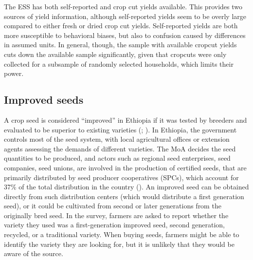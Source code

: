 \documentclass[11pt]{article}
\begin{document}

The ESS has both self-reported and crop cut yields available. This provides two sources of yield information, although self-reported yields seem to be overly large compared to either fresh or dried crop cut yields. Self-reported yields are both more susceptible to behavioral biases, but also to confusion caused by differences in assumed units. In general, though, the sample with available cropcut yields cuts down the available sample significantly, given that cropcuts were only collected for a subsample of randomly selected households, which limits their power.


\subsection{Improved seeds}

A crop seed is considered “improved” in Ethiopia if it was tested by breeders and evaluated to be superior to existing varieties  (\citep{MoA13}; \citep{kosmowski2020shining}). In Ethiopia, the government controls most of the seed system, with local agricultural offices or extension agents assessing the demands of different varieties. The MoA decides the seed quantities to be produced, and actors such as regional seed enterprises, seed companies, seed unions, are involved in the production of certified seeds, that are primarily distributed by seed producer cooperatives (SPCs), which account for 37\% of the total distribution in the country (\citep{kosmowski2020shining}). An improved seed can be obtained directly from such distribution centers (which would distribute a first generation seed), or it could be cultivated from second or later generations from the originally bred seed. In the survey, farmers are asked to report whether the variety they used was a first-generation improved seed, second generation, recycled, or a traditional variety. When buying seeds, farmers might be able to identify the variety they are looking for, but it is unlikely that they would be aware of the source. 
\end{document}
